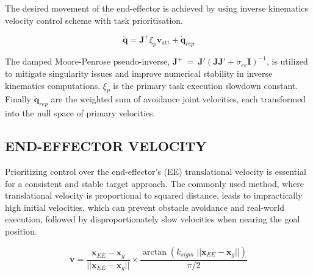 \documentclass[letterpaper, 10 pt, conference]{ieeeconf}  %
\begin{document}
The desired movement of the end-effector is achieved by using inverse kinematics velocity control scheme with task prioritisation. 

\begin{equation}
	\dot{\mathbf{q}} = \mathbf{J}^+ \xi_{p} \mathrm{\mathbf{v}_{att}} + \dot{\mathbf{q}}_{rep}
\end{equation}

The damped Moore-Penrose pseudo-inverse, \(\mathbf{J}^+~=~\mathbf{J}'(\mathbf{J}\mathbf{J}' + \sigma_{ee} \mathbf{I})^{-1}\), is utilized to mitigate singularity issues and improve numerical stability in inverse kinematics computations. $\xi_{p}$ is the primary task execution slowdown constant. Finally $\dot{\mathbf{q}}_{rep}$ are the weighted sum of avoidance joint velocities, each transformed into the null space of primary velocities.


\subsection{END-EFFECTOR VELOCITY}

Prioritizing control over the end-effector's (EE) translational velocity is essential for a consistent and stable target approach. The commonly used method, where translational velocity is proportional to squared distance, leads to impractically high initial velocities, which can prevent obstacle avoidance and real-world execution, followed by disproportionately slow velocities when nearing the goal position. 


\begin{equation} 
	\mathbf{v} = \frac{\mathbf{x}_{EE} - \mathbf{x}_g}{||\mathbf{x}_{EE} - \mathbf{x}_g||} \times \frac{\arctan(k_{sigm} \; ||\mathbf{x}_{EE} - \mathbf{x}_g||) }{\pi/2}
	\label{eq: v_att}
\end{equation}
\end{document}
